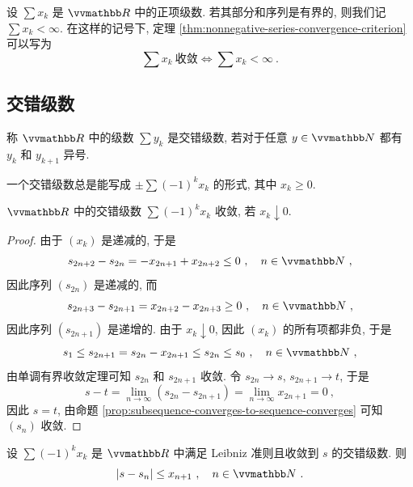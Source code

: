 设 \(\sum x_k\) 是 \(\R\) 中的正项级数. 若其部分和序列是有界的, 则我们记 \(\sum x_k < \infty\). 在这样的记号下, 定理 \ref{thm:nonnegative-series-convergence-criterion} 可以写为
\[
    \sum x_k\ \text{收敛} \iff \sum x_k < \infty\ .
\]

\subsection{交错级数}

\begin{definition}[交错级数]
    称 \(\R\) 中的级数 \(\sum y_k\) 是交错级数, 若对于任意 \(y \in \N\) 都有 \(y_k\) 和 \(y_{k + 1}\) 异号.
\end{definition}

一个交错级数总是能写成 \(\pm \sum (- 1)^k x_k\) 的形式, 其中 \(x_k \geq 0\).

\begin{theorem}[Leibniz 准则]
    \(\R\) 中的交错级数 \(\sum (- 1)^k x_k\) 收敛, 若 \(x_k \downarrow 0\).
\end{theorem}

\begin{proof}
    由于 \((x_k)\) 是递减的, 于是
    \[
        s_{2 n + 2} - s_{2 n} = - x_{2 n + 1} + x_{2 n + 2} \leq 0\ ,\quad n \in \N\ ,
    \]
    因此序列 \((s_{2 n})\) 是递减的, 而
    \[
        s_{2 n + 3} - s_{2 n + 1} = x_{2 n + 2} - x_{2 n + 3} \geq 0\ ,\quad n \in \N\ ,
    \]
    因此序列 \((s_{2 n + 1})\) 是递增的. 由于 \(x_k \downarrow 0\), 因此 \((x_k)\) 的所有项都非负, 于是
    \[
        s_1 \leq s_{2 n + 1} = s_{2 n} - x_{2 n + 1} \leq s_{2 n} \leq s_0\ ,\quad n \in \N\ ,
    \]
    由单调有界收敛定理可知 \(s_{2 n}\) 和 \(s_{2 n + 1}\) 收敛. 令 \(s_{2 n} \to s\), \(s_{2 n + 1} \to t\), 于是
    \[
        s - t = \lim_{n \to \infty} (s_{2 n} - s_{2 n + 1}) = \lim_{n \to \infty} x_{2 n + 1} = 0\ ,
    \]
    因此 \(s = t\), 由命题 \ref{prop:subsequence-converges-to-sequence-converges} 可知 \((s_n)\) 收敛.
\end{proof}

\begin{corollary}\label{cor:alternating-series-error-estimate}
    设 \(\sum (- 1)^k x_k\) 是 \(\R\) 中满足 Leibniz 准则且收敛到 \(s\) 的交错级数. 则
    \[
        |s - s_n| \leq x_{n + 1}\ ,\quad n \in \N\ .
    \]
\end{corollary}

